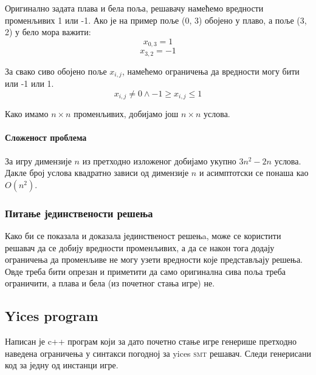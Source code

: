 \documentclass[a4paper]{article}
\begin{document}
Оригинално задата плава и бела поља, решавачу намећемо вредности променљивих 1 или -1. Ако је на пример
поље (0, 3) обојено у плаво, а поље (3, 2) у бело мора важити:
$$ x_{0, 3} = 1 $$
$$ x_{3, 2} = -1 $$

За свако сиво обојено поље $x_{i, j}$, намећемо ограничења да вредности могу бити или -1 или 1.
$$
    x_{i, j} \neq 0 \land -1 \geq x_{i, j} \leq 1
$$

Како имамо $n \times n$ променљивих, добијамо још $n \times n$ услова.

\paragraph{Сложеност проблема} За игру димензије $n$ из претходно изложеног добијамо укупно $3n^2 - 2n$ услова.
Дакле број услова квадратно зависи од димензије $n$ и асимптотски се понаша као $O(n^2)$.

\subsubsection{Питање јединствености решења}
Како би се показала и доказала јединственост решењa, може се користити решавач да се добију вредности променљивих, а да се након тога
додају ограничења да променљиве не могу узети вредности које представљају решења. Овде треба бити опрезан и приметити да само оригинална сива
поља треба ограничити, а плава и бела (из почетног стања игре) не.

\subsection{Yices program}
Написан је c++ програм који за дато почетно стање игре генерише претходно наведена ограничења у синтакси погодној за
yices \textsc{smt} решавач. Следи генерисани код за једну од инстанци игре.
\end{document}
